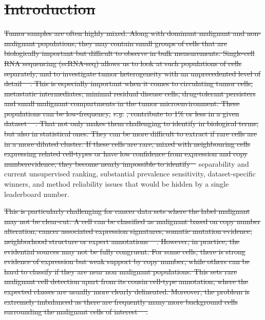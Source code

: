 \documentclass[10pt]{article}
\providecommand{\DIFaddtex}[1]{{\protect\color{trackgreen}#1}} %
\providecommand{\DIFdeltex}[1]{{\protect\color{red}\sout{#1}}}                      %
\providecommand{\DIFaddbegin}{} %
\providecommand{\DIFaddend}{} %
\providecommand{\DIFdelbegin}{} %
\providecommand{\DIFdelend}{} %
\providecommand{\DIFadd}[1]{\texorpdfstring{\DIFaddtex{#1}}{#1}} %
\providecommand{\DIFdel}[1]{\texorpdfstring{\DIFdeltex{#1}}{}} %
\newcommand{\DIFscaledelfig}{0.5}
\newlength{\DIFdelgraphicswidth} %
\newlength{\DIFdelgraphicsheight} %
\newcommand{\DIFaddincludegraphics}[2][]{{\color{trackgreen}\fbox{\DIFOincludegraphics[#1]{#2}}}} %
\newcommand{\DIFdelincludegraphics}[2][]{%
\sbox{\DIFdelgraphicsbox}{\DIFOincludegraphics[#1]{#2}}%
\settoboxwidth{\DIFdelgraphicswidth}{\DIFdelgraphicsbox} %
\settoboxtotalheight{\DIFdelgraphicsheight}{\DIFdelgraphicsbox} %
\scalebox{\DIFscaledelfig}{%
\parbox[b]{\DIFdelgraphicswidth}{\usebox{\DIFdelgraphicsbox}\\[-\baselineskip] \rule{\DIFdelgraphicswidth}{0em}}\llap{\resizebox{\DIFdelgraphicswidth}{\DIFdelgraphicsheight}{%
\setlength{\unitlength}{\DIFdelgraphicswidth}%
\begin{picture}(1,1)%
\thicklines\linethickness{2pt} %
{\color[rgb]{1,0,0}\put(0,0){\framebox(1,1){}}}%
{\color[rgb]{1,0,0}\put(0,0){\line( 1,1){1}}}%
{\color[rgb]{1,0,0}\put(0,1){\line(1,-1){1}}}%
\end{picture}%
}\hspace*{3pt}}} %
} %
\DeclareRobustCommand{\DIFaddbegin}{\DIFOaddbegin \let\includegraphics\DIFaddincludegraphics} %
\DeclareRobustCommand{\DIFaddend}{\DIFOaddend \let\includegraphics\DIFOincludegraphics} %
\DeclareRobustCommand{\DIFdelbegin}{\DIFOdelbegin \let\includegraphics\DIFdelincludegraphics} %
\DeclareRobustCommand{\DIFdelend}{\DIFOaddend \let\includegraphics\DIFOincludegraphics} %
\begin{document}
\section{\DIFdel{Introduction}}
\addtocounter{section}{-1}%

\DIFdel{Tumor samples are often highly mixed. Along with dominant malignant and non-malignant populations, they may contain small groups of cells that are biologically important but difficult to observe in bulk measurements. Single-cell RNA sequencing (scRNA-seq) allows us to look at such populations of cells separately, and to investigate tumor heterogeneity with an unprecedented level of detail \mbox{%
\cite{papalexi2018single,tirosh2024cancer}}\hskip0pt%
. This is especially important when it comes to circulating tumor cells, metastatic intermediates, minimal residual disease cells, drug-tolerant persisters and small malignant compartments in the tumor microenvironment. These populations can be low-frequency, }\textit{\DIFdel{e.g.}}%
\DIFdel{, contribute to 1\% or less in a given dataset \mbox{%
\cite{torre2018rare,gao2021delineating}}\hskip0pt%
. That not only makes them challenging to identify in biological terms, but also in statistical ones. They can be more difficult to extract if rare cells are in a more diluted cluster. If these cells are rare, mixed with neighbouring cells expressing related cell-types or have low confidence from expression and copy numberevidence, they become nearly impossible to identify \mbox{%
\cite{martens2023rarity,stegle2015computational,ren2018understanding}}\hskip0pt%
}\DIFdelend \DIFaddbegin \DIFadd{separability and current unsupervised
ranking, substantial prevalence sensitivity, dataset-specific winners,
and method reliability issues that would be hidden by a single
leaderboard number}\DIFaddend .

\DIFdelbegin \DIFdel{This is particularly challenging for cancer data sets where the label malignant may not be clear-cut. A cell can be classified as malignant based on copy number alteration, cancer associated expression signatures, somatic mutation evidence, neighborhood structure or expert annotations \mbox{%
\cite{gao2021delineating,gasper2022variant,nofech2023pan}}\hskip0pt%
. However, in practice, the evidential sources may not be fully congruent. For some cells, there is strong evidence of expression but weak support by copy number, while others can be hard to classify if they are near non malignant populations. This sets rare malignant cell detection apart from its cousin cell-type annotation, where the expected classes are usually more clearly delineated. Moreover, the problem is extremely imbalanced as there are frequently many more background cells surrounding the malignant cells of interest \mbox{%
\cite{johnson2019survey,altalhan2025imbalanced}}\hskip0pt%
.
}%
\end{document}
